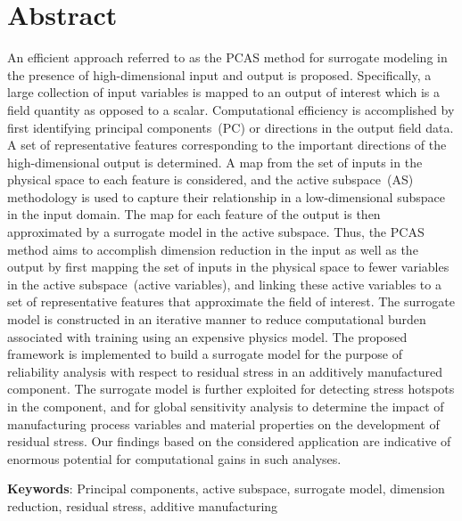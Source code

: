 \section*{Abstract}

An efficient approach referred to as the PCAS method for surrogate modeling in the presence of
high-dimensional input and output is proposed. Specifically, a large
collection of input variables is mapped to an output of interest which is a field quantity as opposed
to a scalar.
Computational efficiency is accomplished by first identifying principal components~(PC)
or directions in  the output field data. A set of representative features corresponding to the important directions
of the high-dimensional output is 
determined. A map from the set of inputs in the physical space to each feature is considered,
and the active subspace~(AS) methodology is used to capture their relationship in a low-dimensional subspace in the input 
domain. The map for each feature of the output is then approximated by a surrogate model in the active subspace. Thus, the PCAS
method aims to accomplish dimension reduction in the input as well as the output by first mapping the set of inputs
in the physical space to fewer variables in the active subspace~(active variables), and linking these active variables
to a set of representative features
that approximate the field of interest. 
The surrogate model is constructed in an iterative manner to reduce computational burden
associated with training using an expensive physics model. 
The proposed framework is implemented to build a surrogate model for the purpose of reliability analysis
with respect to residual stress in an additively
manufactured component. The surrogate model is further exploited for detecting 
stress hotspots in the component, and for global sensitivity analysis to determine the impact of manufacturing process variables and
material properties on the development of residual stress. Our findings based on the considered application
are indicative of enormous potential for computational gains in such analyses. 

\bigskip

\noindent \textbf{Keywords}: Principal components, active subspace, surrogate model, dimension reduction,
residual stress, additive manufacturing
